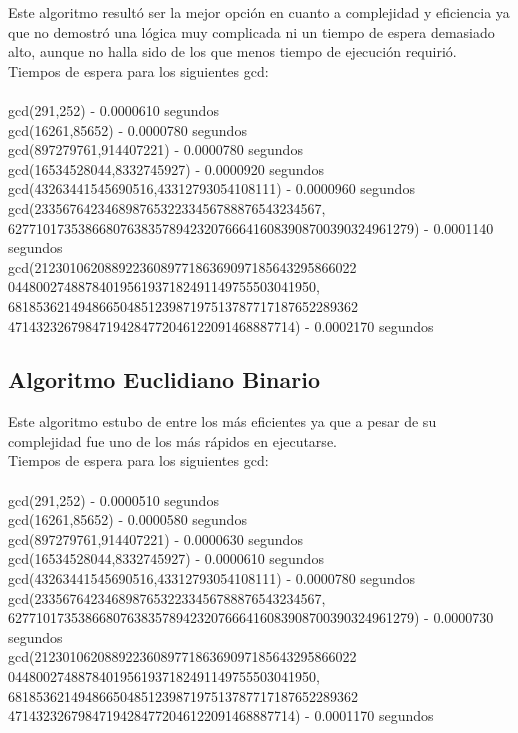 \documentclass[12pt,letterpaper]{scrartcl}
\begin{document}
Este algoritmo resultó ser la mejor opción en cuanto a complejidad y eficiencia ya que no demostró una lógica muy complicada ni un tiempo de espera demasiado alto, aunque no halla sido de los que menos tiempo de ejecución requirió.
\\
Tiempos de espera para los siguientes gcd:
\\\\
gcd(291,252) - 0.0000610 segundos
\\
gcd(16261,85652) - 0.0000780 segundos
\\
gcd(897279761,914407221) - 0.0000780 segundos
\\
gcd(16534528044,8332745927) - 0.0000920 segundos
\\
gcd(43263441545690516,43312793054108111) - 0.0000960 segundos
\\
gcd(23356764234689876532233456788876543234567,\\
6277101735386680763835789423207666416083908700390324961279) - 0.0001140 segundos
\\
gcd(2123010620889223608977186369097185643295866022\\04480027488784019561937182491149755503041950,\\
68185362149486650485123987197513787717187652289362\\47143232679847194284772046122091468887714) - 0.0002170 segundos


\newpage

\subsection{Algoritmo Euclidiano Binario}

Este algoritmo estubo de entre los más eficientes ya que a pesar de su complejidad fue uno de los más rápidos en ejecutarse.
\\
Tiempos de espera para los siguientes gcd:
\\\\
gcd(291,252) - 0.0000510 segundos
\\
gcd(16261,85652) - 0.0000580 segundos
\\
gcd(897279761,914407221) - 0.0000630 segundos
\\
gcd(16534528044,8332745927) - 0.0000610 segundos
\\
gcd(43263441545690516,43312793054108111) - 0.0000780 segundos
\\
gcd(23356764234689876532233456788876543234567,\\
6277101735386680763835789423207666416083908700390324961279) - 0.0000730 segundos
\\
gcd(2123010620889223608977186369097185643295866022\\04480027488784019561937182491149755503041950,\\
68185362149486650485123987197513787717187652289362\\47143232679847194284772046122091468887714) - 0.0001170 segundos
\end{document}
